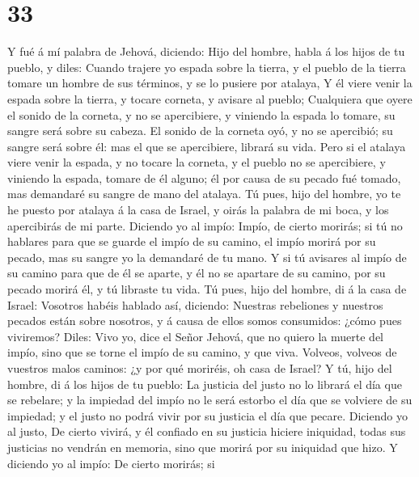 \hypertarget{section-32}{%
\section{33}\label{section-32}}

 Y fué á mí palabra de Jehová, diciendo: 
Hijo del hombre, habla á los hijos de tu pueblo, y diles: Cuando trajere
yo espada sobre la tierra, y el pueblo de la tierra tomare un hombre de
sus términos, y se lo pusiere por atalaya,  Y él viere
venir la espada sobre la tierra, y tocare corneta, y avisare al pueblo;
 Cualquiera que oyere el sonido de la corneta, y no se
apercibiere, y viniendo la espada lo tomare, su sangre será sobre su
cabeza.  El sonido de la corneta oyó, y no se apercibió;
su sangre será sobre él: mas el que se apercibiere, librará su vida.
 Pero si el atalaya viere venir la espada, y no tocare la
corneta, y el pueblo no se apercibiere, y viniendo la espada, tomare de
él alguno; él por causa de su pecado fué tomado, mas demandaré su sangre
de mano del atalaya.  Tú pues, hijo del hombre, yo te he
puesto por atalaya á la casa de Israel, y oirás la palabra de mi boca, y
los apercibirás de mi parte.  Diciendo yo al impío: Impío,
de cierto morirás; si tú no hablares para que se guarde el impío de su
camino, el impío morirá por su pecado, mas su sangre yo la demandaré de
tu mano.  Y si tú avisares al impío de su camino para que
de él se aparte, y él no se apartare de su camino, por su pecado morirá
él, y tú libraste tu vida.  Tú pues, hijo del hombre, di
á la casa de Israel: Vosotros habéis hablado así, diciendo: Nuestras
rebeliones y nuestros pecados están sobre nosotros, y á causa de ellos
somos consumidos: ¿cómo pues viviremos?  Diles: Vivo yo,
dice el Señor Jehová, que no quiero la muerte del impío, sino que se
torne el impío de su camino, y que viva. Volveos, volveos de vuestros
malos caminos: ¿y por qué moriréis, oh casa de Israel?  Y
tú, hijo del hombre, di á los hijos de tu pueblo: La justicia del justo
no lo librará el día que se rebelare; y la impiedad del impío no le será
estorbo el día que se volviere de su impiedad; y el justo no podrá vivir
por su justicia el día que pecare.  Diciendo yo al justo,
De cierto vivirá, y él confiado en su justicia hiciere iniquidad, todas
sus justicias no vendrán en memoria, sino que morirá por su iniquidad
que hizo.  Y diciendo yo al impío: De cierto morirás; si
